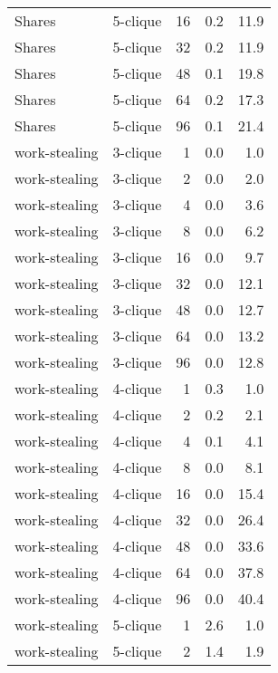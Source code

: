 \begin{longtable}{llr|rr}
        Shares &  5-clique &           16 &   0.2 &     11.9 \\
        Shares &  5-clique &           32 &   0.2 &     11.9 \\
        Shares &  5-clique &           48 &   0.1 &     19.8 \\
        Shares &  5-clique &           64 &   0.2 &     17.3 \\
        Shares &  5-clique &           96 &   0.1 &     21.4 \\
 work-stealing &  3-clique &            1 &   0.0 &      1.0 \\
 work-stealing &  3-clique &            2 &   0.0 &      2.0 \\
 work-stealing &  3-clique &            4 &   0.0 &      3.6 \\
 work-stealing &  3-clique &            8 &   0.0 &      6.2 \\
 work-stealing &  3-clique &           16 &   0.0 &      9.7 \\
 work-stealing &  3-clique &           32 &   0.0 &     12.1 \\
 work-stealing &  3-clique &           48 &   0.0 &     12.7 \\
 work-stealing &  3-clique &           64 &   0.0 &     13.2 \\
 work-stealing &  3-clique &           96 &   0.0 &     12.8 \\
 work-stealing &  4-clique &            1 &   0.3 &      1.0 \\
 work-stealing &  4-clique &            2 &   0.2 &      2.1 \\
 work-stealing &  4-clique &            4 &   0.1 &      4.1 \\
 work-stealing &  4-clique &            8 &   0.0 &      8.1 \\
 work-stealing &  4-clique &           16 &   0.0 &     15.4 \\
 work-stealing &  4-clique &           32 &   0.0 &     26.4 \\
 work-stealing &  4-clique &           48 &   0.0 &     33.6 \\
 work-stealing &  4-clique &           64 &   0.0 &     37.8 \\
 work-stealing &  4-clique &           96 &   0.0 &     40.4 \\
 work-stealing &  5-clique &            1 &   2.6 &      1.0 \\
 work-stealing &  5-clique &            2 &   1.4 &      1.9 \\

\end{longtable}
